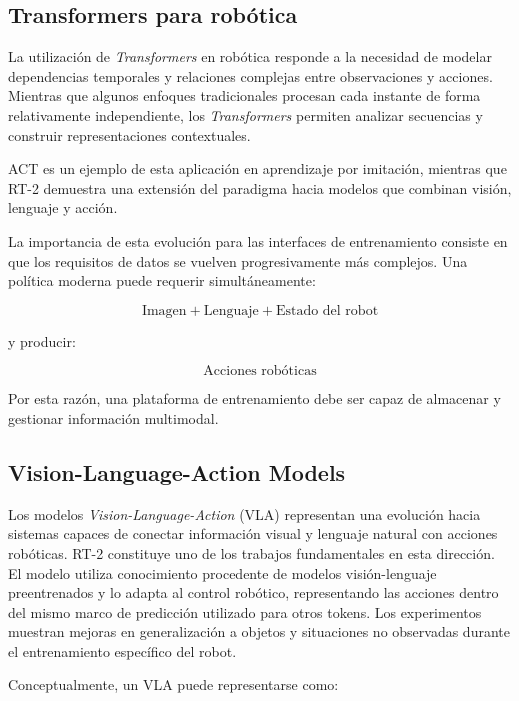 \documentclass[stu,12pt,floatsintext]{apa7}
\begin{document}
\subsection{Transformers para robótica}

La utilización de \textit{Transformers} en robótica responde a la necesidad de modelar dependencias temporales y relaciones complejas entre observaciones y acciones. Mientras que algunos enfoques tradicionales procesan cada instante de forma relativamente independiente, los \textit{Transformers} permiten analizar secuencias y construir representaciones contextuales.

ACT es un ejemplo de esta aplicación en aprendizaje por imitación, mientras que RT-2 demuestra una extensión del paradigma hacia modelos que combinan visión, lenguaje y acción.

La importancia de esta evolución para las interfaces de entrenamiento consiste en que los requisitos de datos se vuelven progresivamente más complejos. Una política moderna puede requerir simultáneamente:

\begin{equation}
\text{Imagen} + \text{Lenguaje} + \text{Estado del robot}
\end{equation}

y producir:

\begin{equation}
\text{Acciones robóticas}
\end{equation}

Por esta razón, una plataforma de entrenamiento debe ser capaz de almacenar y gestionar información multimodal.

\subsection{Vision-Language-Action Models}

Los modelos \textit{Vision-Language-Action} (VLA) representan una evolución hacia sistemas capaces de conectar información visual y lenguaje natural con acciones robóticas. RT-2 constituye uno de los trabajos fundamentales en esta dirección. El modelo utiliza conocimiento procedente de modelos visión-lenguaje preentrenados y lo adapta al control robótico, representando las acciones dentro del mismo marco de predicción utilizado para otros tokens. Los experimentos muestran mejoras en generalización a objetos y situaciones no observadas durante el entrenamiento específico del robot.

Conceptualmente, un VLA puede representarse como:
\end{document}
